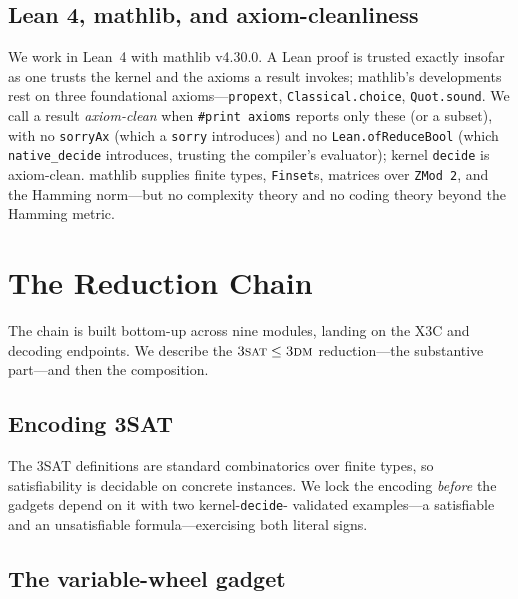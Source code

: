 \documentclass[sigplan,review,anonymous]{acmart}
\begin{document}
\subsection{Lean 4, mathlib, and axiom-cleanliness}\label{sec:axiomclean}

We work in Lean~4 with mathlib v4.30.0. A Lean proof is trusted exactly insofar as one trusts the kernel and
the axioms a result invokes; mathlib's developments rest on three foundational axioms---\lstinline{propext},
\lstinline{Classical.choice}, \lstinline{Quot.sound}. We call a result \emph{axiom-clean} when
\lstinline{#print axioms} reports only these (or a subset), with no \lstinline{sorryAx} (which a
\lstinline{sorry} introduces) and no \lstinline{Lean.ofReduceBool} (which \lstinline{native_decide} introduces,
trusting the compiler's evaluator); kernel \lstinline{decide} is axiom-clean. mathlib supplies finite types,
\lstinline{Finset}s, matrices over \lstinline{ZMod 2}, and the Hamming norm---but no complexity theory and no
coding theory beyond the Hamming metric.

\section{The Reduction Chain}\label{sec:chain}

The chain is built bottom-up across nine modules, landing on the X3C and decoding endpoints. We describe the
$\textsc{3sat} \le \textsc{3dm}$ reduction---the substantive part---and then the composition.

\subsection{Encoding 3SAT}\label{sec:3sat}

The 3SAT definitions are standard combinatorics over finite types, so satisfiability is decidable on concrete
instances. We lock the encoding \emph{before} the gadgets depend on it with two kernel-\lstinline{decide}-
validated examples---a satisfiable and an unsatisfiable formula---exercising both literal signs.

\subsection{The variable-wheel gadget}\label{sec:wheel}
\end{document}
